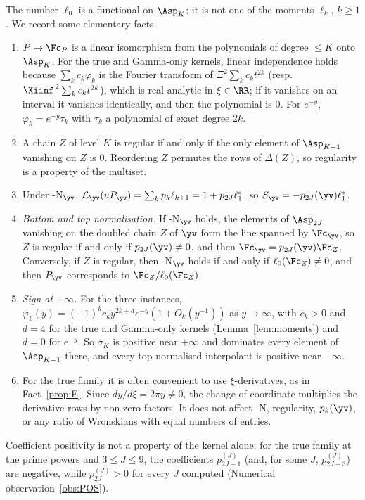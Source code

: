 The number $\ell_0$ is a functional on $\Asp_K$; it is not one of the moments $\ell_k$, $k\ge1$.
We record some elementary facts.
\begin{enumerate}[label=(\alph*),leftmargin=2em]
\item $P\mapsto\Fc_P$ is a linear isomorphism from the polynomials of degree $\le K$ onto $\Asp_K$. For the
true and Gamma-only kernels, linear independence holds because $\sum_kc_k\varphi_k$ is the Fourier
transform of $\Xi^2\sum_kc_kt^{2k}$ (resp.\ $\Xiinf^{\,2}\sum_kc_kt^{2k}$), which is real-analytic in
$\xi\in\RR$; if it vanishes on an interval it vanishes identically, and then the polynomial is $0$. For
$e^{-y}$, $\varphi_k=e^{-y}\tau_k$ with $\tau_k$ a polynomial of exact degree $2k$.
\item A chain $Z$ of level $K$ is regular if and only if the only element of $\Asp_{K-1}$ vanishing on $Z$ is
$0$. Reordering $Z$ permutes the rows of $\Delta(Z)$, so regularity is a property of the multiset.
\item Under \hyp{N}$_{\yv}$, $\mathcal L_{\yv}(uP_{\yv})=\sum_kp_k\ell_{k+1}=1+p_{2J}\ell_1^*$, so
$S_{\yv}=-p_{2J}(\yv)\ell_1^*$.
\item \emph{Bottom and top normalisation.} If \hyp{N}$_{\yv}$ holds, the elements of $\Asp_{2J}$ vanishing on the
doubled chain $Z$ of $\yv$ form the line spanned by $\Fc_{\yv}$, so $Z$ is regular if and only if
$p_{2J}(\yv)\ne0$, and then $\Fc_{\yv}=p_{2J}(\yv)\Fc_Z$. Conversely, if $Z$ is regular, then \hyp{N}$_{\yv}$ holds
if and only if $\ell_0(\Fc_Z)\ne0$, and then $P_{\yv}$ corresponds to $\Fc_Z/\ell_0(\Fc_Z)$.
\item \emph{Sign at $+\infty$.} For the three instances, $\varphi_k(y)=(-1)^kc_ky^{2k+d}e^{-y}(1+O_k(y^{-1}))$ as
$y\to\infty$, with $c_k>0$ and $d=4$ for the true and Gamma-only kernels (Lemma~\ref{lem:moments}) and
$d=0$ for $e^{-y}$. So $\sigma_K$ is positive near $+\infty$ and dominates every element of $\Asp_{K-1}$
there, and every top-normalised interpolant is positive near $+\infty$.
\item For the true family it is often convenient to use $\xi$-derivatives, as in Fact~\ref{prop:E}. Since
$dy/d\xi=2\pi y\ne0$, the change of coordinate multiplies the derivative rows by non-zero factors. It does not affect \hyp{N},
regularity, $p_k(\yv)$, or any ratio of Wronskians with equal numbers of entries.
\end{enumerate}

Coefficient positivity is not a property of the kernel alone: for the true family at the prime powers and
$3\le J\le9$, the coefficients $p^{(J)}_{2J-1}$ (and, for some $J$, $p^{(J)}_{2J-3}$) are negative, while
$p^{(J)}_{2J}>0$ for every $J$ computed (Numerical observation~\ref{obs:POS}).

